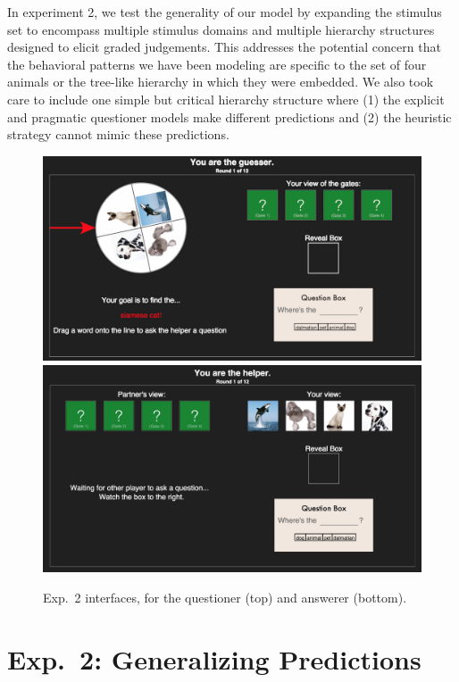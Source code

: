 \documentclass[12pt, floatsintext, jou]{apa6}
\begin{document}
In experiment 2, we test the generality of our model by expanding the stimulus set to encompass multiple stimulus domains and multiple hierarchy structures designed to elicit graded judgements. This addresses the potential concern that the behavioral patterns we have been modeling are specific to the set of four animals or the tree-like hierarchy in which they were embedded. We also took care to include one simple but critical hierarchy structure where (1) the explicit and pragmatic questioner models make different predictions and (2) the heuristic strategy cannot mimic these predictions. 
	\begin{figure}[t!]
\begin{center}
\includegraphics[scale = .3]{Exp4GuesserViewStart}
\includegraphics[scale = .15]{Exp4HelperViewStart}
\end{center}
\caption{Exp.~2 interfaces, for the questioner (top) and answerer (bottom).}
\label{fig:exp4views}
\end{figure}
\section{Exp.~2: Generalizing Predictions}
\end{document}
